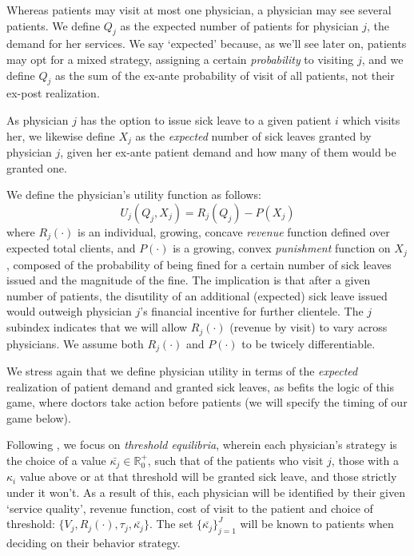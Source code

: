 \documentclass[../main.tex]{subfiles}
\begin{document}
Whereas patients may visit at most one physician, a physician may see several patients. We define $Q_j$ as the expected number of patients for physician $j$, the demand for her services. We say `expected' because, as we'll see later on, patients may opt for a mixed strategy, assigning a certain \textit{probability} to visiting $j$, and we define $Q_j$ as the sum of the ex-ante probability of visit of all patients, not their ex-post realization.

As physician $j$ has the option to issue sick leave to a given patient $i$ which visits her, we likewise define $X_j$ as the \textit{expected} number of sick leaves granted by physician $j$, given her ex-ante patient demand and how many of them would be granted one.

We define the physician's utility function as follows:
\[
U_j(Q_j, X_j) = R_j(Q_j) - P(X_j)
\]
where $R_j(\cdot)$ is an individual, growing, concave \textit{revenue} function defined over expected total clients, and $P(\cdot)$ is a growing, convex \textit{punishment} function on $X_j$, composed of the probability of being fined for a certain number of sick leaves issued and the magnitude of the fine. The implication is that after a given number of patients, the disutility of an additional (expected) sick leave issued would outweigh physician $j$'s financial incentive for further clientele. The $j$ subindex indicates that we will allow $R_j(\cdot)$ (revenue by visit) to vary across physicians. We assume both $R_j(\cdot)$ and $P(\cdot)$ to be twicely differentiable.

We stress again that we define physician utility in terms of the \textit{expected} realization of patient demand and granted sick leaves, as befits the logic of this game, where doctors take action before patients (we will specify the timing of our game below).

Following \cite{schnell2017physician}, we focus on \textit{threshold equilibria}, wherein each physician's strategy is the choice of a value $\bar{\kappa_j} \in \mathbb{R}_0^+$, such that of the patients who visit $j$, those with a $\kappa_i$ value above or at that threshold will be granted sick leave, and those strictly under it won't. As a result of this, each physician will be identified by their given `service quality', revenue function, cost of visit to the patient and choice of threshold: $\{V_j,R_j(\cdot), \tau_j, \bar{\kappa_j}\}$. The set $\{\bar{\kappa_j}\}_{j=1}^{J}$ will be known to patients when deciding on their behavior strategy.
\end{document}
